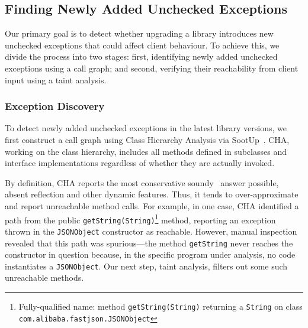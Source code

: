 \subsection{Finding Newly Added Unchecked Exceptions}

Our primary goal is to detect whether upgrading a library introduces new unchecked exceptions that could affect client behaviour. To achieve this, we divide the process into two stages: first, identifying newly added unchecked exceptions using a call graph; and second, verifying their reachability from client input using a taint analysis.

\subsubsection{Exception Discovery}

To detect newly added unchecked exceptions in the latest library versions, we first construct a call graph using Class Hierarchy Analysis via SootUp~\cite{Karakaya24:_sootup}. CHA, working on the class hierarchy, includes all methods defined in subclasses and interface implementations regardless of whether they are actually invoked.


By definition, CHA reports the most conservative soundy~\cite{livshits15:_in} answer possible, absent reflection and other dynamic features. Thus, it tends to over-approximate and report unreachable method calls. For example, in one case, CHA identified a path from the public \texttt{getString(String)}\footnote{Fully-qualified name: method \texttt{getString(String)} returning a \texttt{String} on class \texttt{com.alibaba.fastjson.JSONObject}} method, reporting an exception thrown in the \texttt{JSONObject} constructor as reachable. However, manual inspection revealed that this path was spurious—the method \texttt{getString} never reaches the constructor in question because, in the specific program under analysis, no code instantiates a \texttt{JSONObject}. Our next step, taint analysis, filters out some such unreachable methods.


